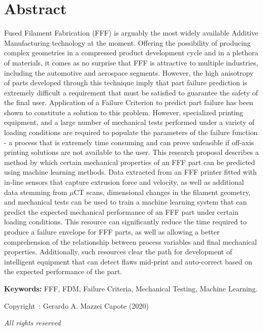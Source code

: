 \documentclass[main.tex]{subfiles}
\begin{document}
\setcounter{page}{1}
\chapter*{Abstract}
Fused Filament Fabrication (FFF) is arguably the most widely available Additive Manufacturing technology at the moment. Offering the possibility of producing complex geometries in a compressed product development cycle and in a plethora of materials, it comes as no surprise that FFF is attractive to multiple industries, including the automotive and aerospace segments. However, the high anisotropy of parts developed through this technique imply that part failure prediction is extremely difficult \textemdash a requirement that must be satisfied to guarantee the safety of the final user. Application of a Failure Criterion to predict part failure has been shown to constitute a solution to this problem. However, specialized printing equipment, and a large number of mechanical tests performed under a variety of loading conditions are required to populate the parameters of the failure function - a process that is extremely time consuming and can prove unfeasible if off-axis printing solutions are not available to the user. This research proposal describes a method by which certain mechanical properties of an FFF part can be predicted using machine learning methods. Data extracted from an FFF printer fitted with in-line sensors that capture extrusion force and velocity, as well as additional data stemming from $\mu$CT scans, dimensional changes in the filament geometry, and mechanical tests can be used to train a machine learning system that can predict the expected mechanical performance of an FFF part under certain loading conditions. This resource can significantly reduce the time required to produce a failure envelope for FFF parts, as well as allowing a better comprehension of the relationship between process variables and final mechanical properties. Additionally, such resources clear the path for development of intelligent equipment that can detect flaws mid-print and auto-correct based on the expected performance of the part.  
 
\vspace{10mm} %
\textbf{Keywords:} FFF, FDM, Failure Criteria, Mechanical Testing, Machine Learning.

\vfill %
\begin{center}
Copyright~\textcopyright: Gerardo A. Mazzei Capote (2020)

\emph{All rights reserved}	
\end{center}
\end{document}
